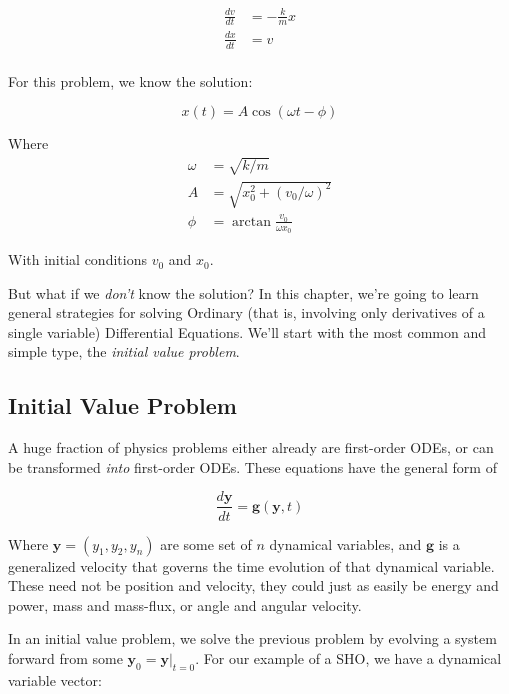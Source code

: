 \documentclass{article}
\theoremstyle{demo}
\begin{document}
\begin{equation}
    \begin{aligned}
        \frac{dv}{dt} &= -\frac{k}{m}x \\
        \frac{dx}{dt} &= v \\
    \end{aligned}
\end{equation}

For this problem, we know the solution:

\begin{equation}
    x(t) = A\cos(\omega t - \phi)
\end{equation}

Where 
\begin{equation}
    \begin{aligned}
        \omega &= \sqrt{k/m} \\
        A &= \sqrt{x_0^2 + (v_0/\omega)^2}\\
        \phi &= \arctan{\frac{v_0}{\omega x_0}} 
    \end{aligned}
\end{equation}

With initial conditions $v_0$ and $x_0$.  

But what if we \textit{don't} know the solution?  In this chapter, we're going
to learn general strategies for solving Ordinary (that is, involving only
derivatives of a single variable) Differential Equations.  We'll start with the
most common and simple type, the \textit{initial value problem}.

\subsection{Initial Value Problem}
A huge fraction of physics problems either already are first-order ODEs, or can
be transformed \textit{into} first-order ODEs.  These equations have the general
form of

\begin{equation}
    \frac{d\mathbf{y}}{dt} = \mathbf{g}(\mathbf{y}, t)
\end{equation}

Where $\mathbf{y} = (y_1, y_2, y_n)$ are some set of $n$ dynamical variables,
and $\mathbf{g}$ is a generalized velocity that governs the time evolution of
that dynamical variable.  These need not be position and velocity, they could
just as easily be energy and power, mass and mass-flux, or angle and angular
velocity.

In an initial value problem, we solve the previous problem by evolving a system
forward from some $\mathbf{y}_0=\mathbf{y}|_{t=0}$.  For our example of a SHO,
we have a dynamical variable vector:
\end{document}

